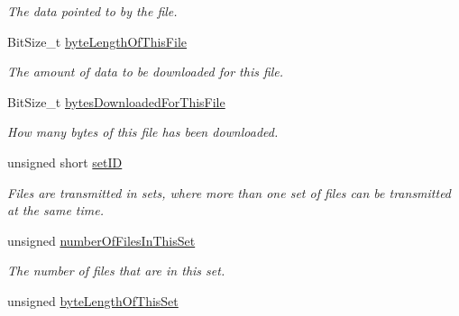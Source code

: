 \begin{DoxyCompactItemize}
\begin{DoxyCompactList}\small\item\em The data pointed to by the file. \end{DoxyCompactList}\item 
\hypertarget{struct_rak_net_1_1_file_list_transfer_c_b_interface_1_1_on_file_struct_a01e1896e18a7cb73f5b820eff4e9c00c}{Bit\-Size\-\_\-t \hyperlink{struct_rak_net_1_1_file_list_transfer_c_b_interface_1_1_on_file_struct_a01e1896e18a7cb73f5b820eff4e9c00c}{byte\-Length\-Of\-This\-File}}\label{struct_rak_net_1_1_file_list_transfer_c_b_interface_1_1_on_file_struct_a01e1896e18a7cb73f5b820eff4e9c00c}

\begin{DoxyCompactList}\small\item\em The amount of data to be downloaded for this file. \end{DoxyCompactList}\item 
\hypertarget{struct_rak_net_1_1_file_list_transfer_c_b_interface_1_1_on_file_struct_a60a1e88744b97fb2598da7bef79096a1}{Bit\-Size\-\_\-t \hyperlink{struct_rak_net_1_1_file_list_transfer_c_b_interface_1_1_on_file_struct_a60a1e88744b97fb2598da7bef79096a1}{bytes\-Downloaded\-For\-This\-File}}\label{struct_rak_net_1_1_file_list_transfer_c_b_interface_1_1_on_file_struct_a60a1e88744b97fb2598da7bef79096a1}

\begin{DoxyCompactList}\small\item\em How many bytes of this file has been downloaded. \end{DoxyCompactList}\item 
unsigned short \hyperlink{struct_rak_net_1_1_file_list_transfer_c_b_interface_1_1_on_file_struct_abbfbb86de031c99ac81438e1d4a350b4}{set\-I\-D}
\begin{DoxyCompactList}\small\item\em Files are transmitted in sets, where more than one set of files can be transmitted at the same time. \end{DoxyCompactList}\item 
\hypertarget{struct_rak_net_1_1_file_list_transfer_c_b_interface_1_1_on_file_struct_a22cc04a1f56c2e423434f166c1ca6a8a}{unsigned \hyperlink{struct_rak_net_1_1_file_list_transfer_c_b_interface_1_1_on_file_struct_a22cc04a1f56c2e423434f166c1ca6a8a}{number\-Of\-Files\-In\-This\-Set}}\label{struct_rak_net_1_1_file_list_transfer_c_b_interface_1_1_on_file_struct_a22cc04a1f56c2e423434f166c1ca6a8a}

\begin{DoxyCompactList}\small\item\em The number of files that are in this set. \end{DoxyCompactList}\item 
\hypertarget{struct_rak_net_1_1_file_list_transfer_c_b_interface_1_1_on_file_struct_ac6c772c697a0c81cd8306b10cf6af039}{unsigned \hyperlink{struct_rak_net_1_1_file_list_transfer_c_b_interface_1_1_on_file_struct_ac6c772c697a0c81cd8306b10cf6af039}{byte\-Length\-Of\-This\-Set}}\label{struct_rak_net_1_1_file_list_transfer_c_b_interface_1_1_on_file_struct_ac6c772c697a0c81cd8306b10cf6af039}


\end{DoxyCompactItemize}
